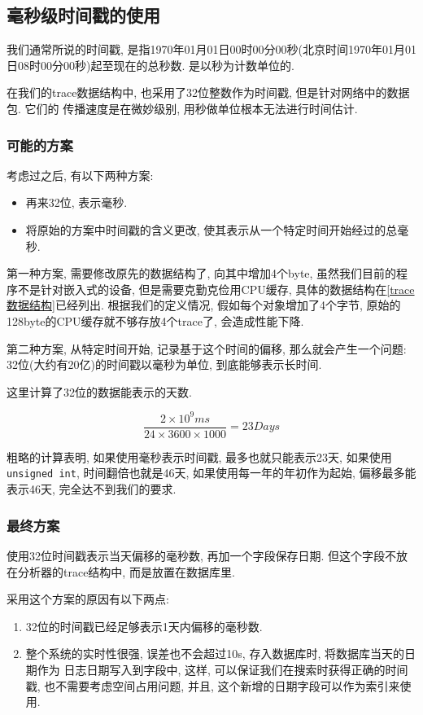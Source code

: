 \subsection{毫秒级时间戳的使用}

我们通常所说的时间戳,
是指1970年01月01日00时00分00秒(北京时间1970年01月01日08时00分00秒)起至现在的总秒数.
是以秒为计数单位的.

在我们的trace数据结构中, 也采用了32位整数作为时间戳, 但是针对网络中的数据包. 它们的
传播速度是在微妙级别, 用秒做单位根本无法进行时间估计.

\subsubsection{可能的方案}

考虑过之后, 有以下两种方案:

\begin{itemize}
\item
  再来32位, 表示毫秒.
\item
  将原始的方案中时间戳的含义更改,
  使其表示从一个特定时间开始经过的总毫秒.
\end{itemize}

第一种方案, 需要修改原先的数据结构了, 向其中增加4个byte,
虽然我们目前的程序不是针对嵌入式的设备, 但是需要克勤克俭用CPU缓存,
具体的数据结构在\ref{trace数据结构}已经列出. 根据我们的定义情况,
假如每个对象增加了4个字节, 原始的128byte的CPU缓存就不够存放4个trace了,
会造成性能下降.

第二种方案, 从特定时间开始, 记录基于这个时间的偏移, 那么就会产生一个问题:
32位(大约有20亿)的时间戳以毫秒为单位, 到底能够表示长时间.

这里计算了32位的数据能表示的天数.

$$ \frac{2 \times 10^{9} ms }{24 \times 3600 \times 1000} = 23 Days$$

粗略的计算表明, 如果使用毫秒表示时间戳, 最多也就只能表示23天,
如果使用\texttt{unsigned\ int}, 时间翻倍也就是46天,
如果使用每一年的年初作为起始, 偏移最多能表示46天, 完全达不到我们的要求.

\subsubsection{最终方案}

使用32位时间戳表示当天偏移的毫秒数, 再加一个字段保存日期.
但这个字段不放在分析器的trace结构中, 而是放置在数据库里.

采用这个方案的原因有以下两点:

\begin{enumerate}
\def\labelenumi{\arabic{enumi}.}
\item
  32位的时间戳已经足够表示1天内偏移的毫秒数.
\item
  整个系统的实时性很强, 误差也不会超过10s, 存入数据库时,
  将数据库当天的日期作为 日志日期写入到字段中, 这样,
  可以保证我们在搜索时获得正确的时间戳, 也不需要考虑空间占用问题, 并且,
  这个新增的日期字段可以作为索引来使用.
\end{enumerate}

